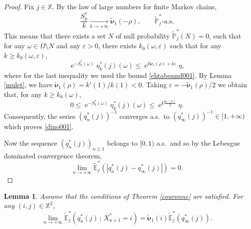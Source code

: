 \documentclass[12pt]{amsart}
\newtheorem{lemma}[theorem]{Lemma}
\theoremstyle{definition}
\numberwithin{equation}{section}
\newcommand*{\abs}[1]{\left\lvert#1\right\rvert}
\def\bb#1{\mathbb{#1}}
\def\tbs#1{\tilde{\boldsymbol{#1}}}
\def\tbb#1{\tilde{\mathbb{#1}}}
\def\geq{\geqslant}
\def\leq{\leqslant}
\newcommand\ee{\varepsilon}
\DeclareMathOperator{\e}{e}
\begin{document}
\begin{proof}
Fix $j \in \bb X$. By the law of large numbers for finite Markov chains,
\[
\frac{S_k^*}{k} \underset{k \to +\infty}{\longrightarrow} \tbs \nu_1(-\rho), \qquad \tbb P_j^*\text{-a.s.}
\]
This means that there exists a set $N$ of null probability $\tbb P_j^*(N) = 0$, such that for any $\omega \in \Omega \setminus N$ and any $\ee > 0$, there exists $k_0(\omega,\ee)$ such that for any $k \geq k_0(\omega,\ee)$,
\[
\e^{-S_k^*(\omega)} \eta_k^*(j)(\omega) \leq \e^{k\tbs \nu_1(\rho)+k\ee} \eta,
\]
where for the last inequality we used the bound \eqref{ehtabound001}.
By Lemma \ref{mulet}, we have $\tbs \nu_1(\rho) = k'(1)/k(1) < 0$. Taking $\ee = -\tbs \nu_1(\rho)/2$ we obtain that, for any $k \geq k_0(\omega),$
\[
0 \leq \e^{-S_k^*(\omega)} \eta_k^*(j)(\omega) \leq \e^{k\frac{\tbs \nu_1(\rho)}{2}} \eta.
\]
Consequently, the series $\left( q_n^*(j) \right)^{-1}$ converges a.s.\ to $\left( q_{\infty}^*(j) \right)^{-1} \in [1,+\infty)$ which proves \eqref{dino001}.

Now the sequence $( q_n^*(j) )_{n\geq 1}$ belongs to $[0,1)$ a.s.\ and so by the Lebesgue dominated convergence theorem,
\[
\lim_{n\to+\infty} \tbb E_j^* \left( \abs{q_n^*(j) - q_{\infty}^*(j)} \right) = 0.
\]
\end{proof}

\begin{lemma} Assume that the conditions of Theorem \ref{couronne} are satisfied.
\label{marsupilami}
For any $(i,j) \in \bb X^2$,
\[
\lim_{n\to +\infty} \tbb E_j^* \left( q_n^*(j) \,;\, X_{n+1}^* = i \right) = \tbs \nu_1(i) \tbb E_j^* \left( q_{\infty}^*(j) \right).
\]
\end{lemma}
\end{document}
